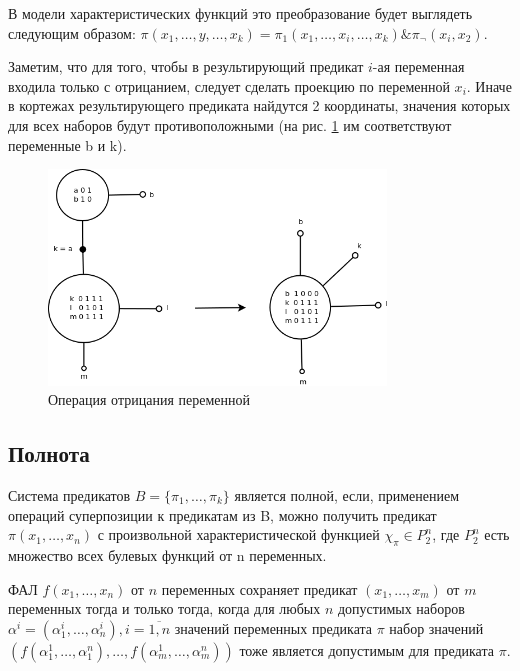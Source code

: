 \documentclass[12pt]{article}
\newenvironment{definition}[1][Определение]{\begin{trivlist}
\item[\hskip \labelsep {\bfseries #1}]}{\end{trivlist}}
\begin{document}
\begin{itemize}
    В модели характеристических функций это преобразование будет выглядеть следующим образом:
    $\pi(x_1, \dots, y, \dots, x_k) = \pi_1(x_1, \dots, x_i, \dots, x_k) \& \pi_{\neg}(x_i, x_2)$.

    Заметим, что для того, чтобы в результирующий предикат $i$-ая переменная входила только с отрицанием, следует сделать 
    проекцию по переменной $x_i$. Иначе в кортежах результирующего предиката найдутся 2 координаты, значения которых
    для всех наборов будут противоположными (на рис. \ref{fig:join_neg_op} им соответствуют переменные b и k).

    \begin{figure}[htb]
    \centering
    \includegraphics[width=0.8\textwidth]{join_neg_op.png}
    \caption{Операция отрицания переменной}
    \label{fig:join_neg_op}
    \samepage
    \end{figure}

\end{itemize}
\subsection{Полнота}

\begin{definition}
Система предикатов $B = \{ \pi_1, \dots, \pi_k \}$ является полной, если, 
применением операций суперпозиции к предикатам из B, можно получить 
предикат $\pi(x_1, \dots, x_n)$ с произвольной характеристической 
функцией $\chi_{\pi} \in P_2^n$, где $P_2^n$ есть множество всех булевых функций от n переменных.
\end{definition}

\begin{definition} ФАЛ
$f (x_1, \ldots, x_n)$ от $n$ переменных сохраняет предикат $ (x_1, \ldots, x_m)$ от $m$
переменных тогда и только тогда, когда для любых $n$ допустимых наборов $\alpha^i = (\alpha_1^i, \ldots, \alpha_n^i), 
i = \overline{1, n}$ значений переменных предиката $\pi$ набор
значений $( f(\alpha_1^1, \ldots, \alpha_1^n), \ldots, f(\alpha_m^1, \ldots, \alpha_m^n) )$
тоже является допустимым для предиката $\pi$.
\end{definition}
\end{document}
